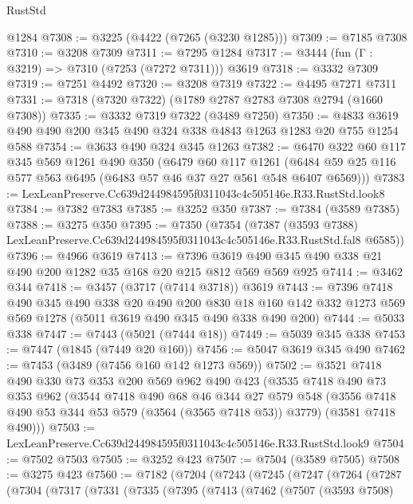 \begin{lexlean}{RustStd}
\begin{coremodule}
    @1284
@7308 := @3225 (@4422 (@7265 (@3230 @1285)))
@7309 := @7185 @7308
@7310 := @3208 @7309
@7311 := @7295 @1284
@7317 := @3444 (fun (Γ : @3219) => @7310 (@7253 (@7272 @7311))) @3619
@7318 := @3332 @7309
@7319 := @7251 @4492
@7320 := @3208 @7319
@7322 := @4495 @7271 @7311
@7331 := @7318 (@7320 @7322) (@1789 @2787 @2783 @7308 @2794 (@1660 @7308))
@7335 := @3332 @7319 @7322 (@3489 @7250)
@7350 := @4833 @3619 @490 @490 @200 @345 @490 @324 @338 @4843 @1263 @1283 @20 @755 @1254 @588
@7354 := @3633 @490 @324 @345 @1263
@7382 := @6470
    @322
    @60
    @117
    @345
    @569
    @1261
    @490
    @350
    (@6479
      @60
      @117
      @1261
      (@6484 @59 @25 @116 @577 @563 @6495 (@6483 @57 @46 @37 @27 @561 @548 @6407 @6569)))
@7383 := LexLeanPreserve.Cc639d244984595f0311043c4c505146e.R33.RustStd.look8
@7384 := @7382 @7383
@7385 := @3252 @350
@7387 := @7384 (@3589 @7385)
@7388 := @3275 @350
@7395 := @7350
    (@7354
      (@7387
        (@3593 @7388)
        LexLeanPreserve.Cc639d244984595f0311043c4c505146e.R33.RustStd.fal8
        @6585))
@7396 := @4966 @3619
@7413 := @7396 @3619 @490 @345 @490 @338 @21 @490 @200 @1282 @35 @168 @20 @215 @812 @569 @569 @925
@7414 := @3462 @344
@7418 := @3457 (@3717 (@7414 @3718)) @3619
@7443 := @7396
    @7418
    @490
    @345
    @490
    @338
    @20
    @490
    @200
    @830
    @18
    @160
    @142
    @332
    @1273
    @569
    @569
    @1278
    (@5011 @3619 @490 @345 @490 @338 @490 @200)
@7444 := @5033 @338
@7447 := @7443 (@5021 (@7444 @18))
@7449 := @5039 @345 @338
@7453 := @7447 (@1845 (@7449 @20 @160))
@7456 := @5047 @3619 @345 @490
@7462 := @7453 (@3489 (@7456 @160 @142 @1273 @569))
@7502 := @3521
    @7418
    @490
    @330
    @73
    @353
    @200
    @569
    @962
    @490
    @423
    (@3535
      @7418
      @490
      @73
      @353
      @962
      (@3544
        @7418
        @490
        @68
        @46
        @344
        @27
        @579
        @548
        (@3556 @7418 @490 @53 @344 @53 @579 (@3564 (@3565 @7418 @53)) @3779)
        (@3581 @7418 @490)))
@7503 := LexLeanPreserve.Cc639d244984595f0311043c4c505146e.R33.RustStd.look9
@7504 := @7502 @7503
@7505 := @3252 @423
@7507 := @7504 (@3589 @7505)
@7508 := @3275 @423
@7560 := @7182
    (@7204
      (@7243
        (@7245
          (@7247
            (@7264
              (@7287
                (@7304
                  (@7317
                    (@7331
                      (@7335
                        (@7395
                          (@7413
                            (@7462
                              (@7507
                                (@3593 @7508)

\end{coremodule}
\end{lexlean}
